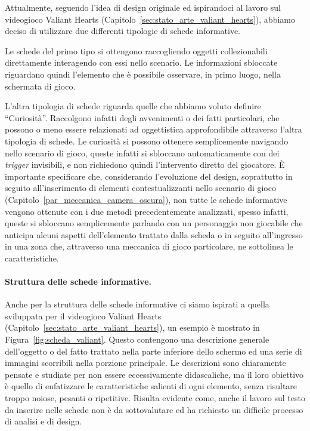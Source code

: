 Attualmente, seguendo l’idea di design originale ed ispirandoci al lavoro sul videogioco Valiant Hearts (Capitolo~\ref{sec:stato_arte_valiant_hearts}), abbiamo deciso di utilizzare due differenti tipologie di schede informative.

Le schede del primo tipo si ottengono raccogliendo oggetti collezionabili direttamente interagendo con essi nello scenario. Le informazioni sbloccate riguardano quindi l’elemento che è possibile osservare, in primo luogo, nella schermata di gioco. 

L’altra tipologia di schede riguarda quelle che abbiamo voluto definire “Curiosità”. Raccolgono infatti degli avvenimenti o dei fatti particolari, che possono o meno essere relazionati ad oggettistica approfondibile attraverso l’altra tipologia di schede. Le curiosità si possono ottenere semplicemente navigando nello scenario di gioco, queste infatti si sbloccano automaticamente con dei \textit{trigger} invisibili, e non richiedono quindi l’intervento diretto del giocatore.
È importante specificare che, considerando l’evoluzione del design, soprattutto in seguito all’inserimento di elementi contestualizzanti nello scenario di gioco (Capitolo~\ref{par_meccanica_camera_oscura}), non tutte le schede informative vengono ottenute con i due metodi precedentemente analizzati, spesso infatti, queste si sbloccano semplicemente parlando con un personaggio non giocabile che anticipa alcuni aspetti dell’elemento trattato dalla scheda o in seguito all’ingresso in una zona che, attraverso una meccanica di gioco particolare, ne sottolinea le caratteristiche.

\paragraph{Struttura delle schede informative.}
\label{par:struttura_schede}

Anche per la struttura delle schede informative ci siamo ispirati a quella sviluppata per il videogioco Valiant Hearts (Capitolo~\ref{sec:stato_arte_valiant_hearts}), un esempio è mostrato in Figura~\ref{fig:scheda_valiant}. Questo contengono una descrizione generale dell’oggetto o del fatto trattato nella parte inferiore dello schermo ed una serie di immagini scorribili nella porzione principale.
Le descrizioni sono chiaramente pensate e studiate per non essere eccessivamente didascaliche, ma il loro obiettivo è quello di enfatizzare le caratteristiche salienti di ogni elemento, senza risultare troppo noiose, pesanti o ripetitive. Risulta evidente come, anche il lavoro sul testo da inserire nelle schede non è da sottovalutare ed ha richiesto un difficile processo di analisi e di design.

